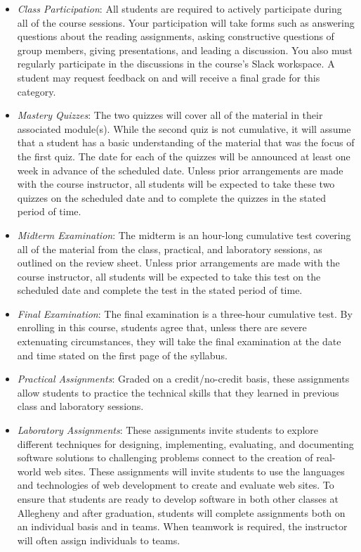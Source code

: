 \documentclass[11pt]{article}
\begin{document}
\begin{itemize}

  \item {\em Class Participation\/}: All students are required to actively
    participate during all of the course sessions. Your participation will take
    forms such as answering questions about the reading assignments, asking
    constructive questions of group members, giving presentations, and leading a
    discussion. You also must regularly participate in the discussions in the
    course's Slack workspace. A student may request feedback on and will receive
    a final grade for this category.

  \item {\em Mastery Quizzes\/}: The two quizzes will cover all of the material
    in their associated module(s). While the second quiz is not cumulative, it
    will assume that a student has a basic understanding of the material that
    was the focus of the first quiz. The date for each of the quizzes will be
    announced at least one week in advance of the scheduled date. Unless prior
    arrangements are made with the course instructor, all students will be
    expected to take these two quizzes on the scheduled date and to complete the
    quizzes in the stated period of time.

  \item {\em Midterm Examination\/}: The midterm is an hour-long cumulative test
    covering all of the material from the class, practical, and laboratory
    sessions, as outlined on the review sheet. Unless prior arrangements are
    made with the course instructor, all students will be expected to take this
    test on the scheduled date and complete the test in the stated period of
    time.

  \item {\em Final Examination\/}: The final examination is a three-hour
    cumulative test. By enrolling in this course, students agree that, unless
    there are severe extenuating circumstances, they will take the final
    examination at the date and time stated on the first page of the syllabus.

  \item {\em Practical Assignments\/}: Graded on a credit/no-credit basis, these
    assignments allow students to practice the technical skills that they
    learned in previous class and laboratory sessions.

  \item {\em Laboratory Assignments\/}: These assignments invite students to
    explore different techniques for designing, implementing, evaluating, and
    documenting software solutions to challenging problems connect to the
    creation of real-world web sites. These assignments will invite students to
    use the languages and technologies of web development to create and evaluate
    web sites. To ensure that students are ready to develop software in both
    other classes at Allegheny and after graduation, students will complete
    assignments both on an individual basis and in teams. When teamwork is
    required, the instructor will often assign individuals to teams.


\end{itemize}
\end{document}
